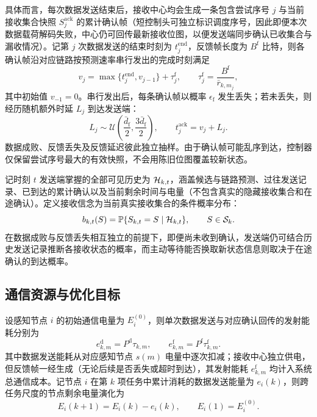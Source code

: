 \begin{figure}[htbp]
\centering

\label{rq3:fig:delivery-scene}
\end{figure}

具体而言，每次数据发送结束后，接收中心均会生成一条包含尝试序号 $j$ 与当前接收集合快照 $S_j^{\mathrm{ack}}$ 的累计确认帧（短控制头可独立标识调度序号，因此即便本次数据载荷解码失败，中心仍可回传最新接收位图，以便发送端同步确认已收集合与漏收情况）。记第 $j$ 次数据发送的结束时刻为 $t_j^{\mathrm{end}}$，反馈帧长度为 $B^{\mathrm f}$ 比特，则各确认帧沿对应链路按预测速率串行发出的完成时刻满足
\begin{equation}
  v_j=\max\{t_j^{\mathrm{end}},v_{j-1}\}+\tau_j^{\mathrm f},
  \qquad \tau_j^{\mathrm f}=\frac{B^{\mathrm f}}{\bar r_{k,m_j}},
  \label{rq3:eq:feedback-serialization}
\end{equation}
其中初始值 $v_{-1}=0$。串行发出后，每条确认帧以概率 $\epsilon_{\mathrm f}$ 发生丢失；若未丢失，则经历随机额外时延 $L_j$ 到达发送端：
\begin{equation}
  L_j\sim\mathcal{U}\left(\frac{\bar d_{\mathrm f}}{2},\frac{3\bar d_{\mathrm f}}{2}\right),
  \qquad t_j^{\mathrm{ack}}=v_j+L_j.
  \label{rq3:eq:feedback-delay}
\end{equation}
数据成败、反馈丢失及反馈延迟彼此独立抽样。由于确认帧可能乱序到达，控制器仅保留尝试序号最大的有效快照，不会用陈旧位图覆盖较新状态。

记时刻 $t$ 发送端掌握的全部可见历史为 $\mathcal{H}_{k,t}$，涵盖候选与链路预测、过往发送记录、已到达的累计确认以及当前剩余时间与电量（不包含真实的隐藏接收集合和在途确认）。定义接收信念为当前真实接收集合的条件概率分布：
\begin{equation}
  b_{k,t}(S)=\mathbb{P}\{S_{k,t}=S\mid\mathcal{H}_{k,t}\},\qquad S\in\mathcal{S}_k.
  \label{rq3:eq:belief-definition}
\end{equation}
在数据成败与反馈丢失相互独立的前提下，即便尚未收到确认，发送端仍可结合历史发送记录推断各接收状态的概率，而主动等待能否换取新状态信息则取决于在途确认的到达概率。

\subsection{通信资源与优化目标}
\label{rq3:subsec:energy}
\label{rq3:subsec:objective}

设感知节点 $i$ 的初始通信电量为 $E_i^{(0)}$，则单次数据发送与对应确认回传的发射能耗分别为
\begin{equation}
  e_{k,m}^{\mathrm d}=P^{\mathrm d}\tau_{k,m},\qquad
  e_{k,m}^{\mathrm f}=P^{\mathrm f}\tau_{k,m}^{\mathrm f}.
  \label{rq3:eq:transmit-energy}
\end{equation}
其中数据发送能耗从对应感知节点 $s(m)$ 电量中逐次扣减；接收中心独立供电，但反馈帧一经生成（无论后续是否丢失或超时到达），其发射能耗 $e_{k,m}^{\mathrm f}$ 均计入系统总通信成本。记节点 $i$ 在第 $k$ 项任务中累计消耗的数据发送能量为 $e_i(k)$，则跨任务尺度的节点剩余电量演化为
\begin{equation}
  E_i(k+1)=E_i(k)-e_i(k),\qquad E_i(1)=E_i^{(0)}.
  \label{rq3:eq:energy-evolution}
\end{equation}

